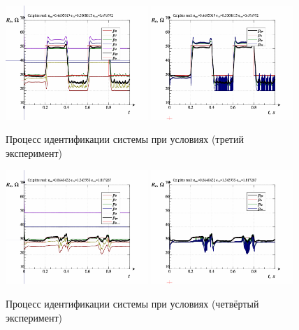 \begin{figure}[htb!]
  \centerline{
    \includegraphics[width=0.48\textwidth]{p/colp_real_id_qi_fv5_3-p_p.png}
    \hfill
    \includegraphics[width=0.48\textwidth]{p/colp_real_id_qi_fv5_3-p_pp.png}
  }
  \caption{Процесс идентификации системы  при условиях (третий эксперимент)}
  \label{atu:f:colp_real_id_qi_fv5_3}
\end{figure}


\begin{figure}[htb!]
  \centerline{
    \includegraphics[width=0.48\textwidth]{p/colp_real_id_qi_fv5_4-p_p.png}
    \hfill
    \includegraphics[width=0.48\textwidth]{p/colp_real_id_qi_fv5_4-p_pp.png}
  }
  \caption{Процесс идентификации системы  при условиях (четвёртый эксперимент)}
  \label{atu:f:colp_real_id_qi_fv5_4}
\end{figure}


